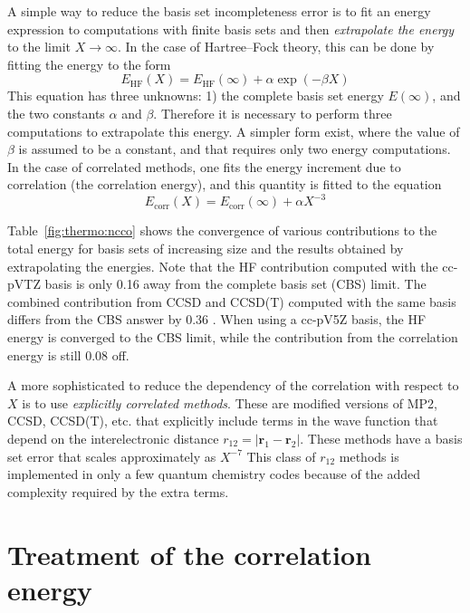 \documentclass[../Main/notes.tex]{subfiles}
\begin{document}
A simple way to reduce the basis set incompleteness error is to fit an energy expression to computations with finite basis sets and then \emph{extrapolate the energy} to the limit $X \rightarrow \infty$.
In the case of Hartree--Fock theory, this can be done by fitting the energy to the form
\begin{equation}
E_\mathrm{HF}(X) = E_\mathrm{HF}(\infty) + \alpha \exp(-\beta X)
\end{equation}
This equation has three unknowns: 1) the complete basis set energy $E(\infty)$, and the two constants $\alpha$ and $\beta$.
Therefore it is necessary to perform three computations to extrapolate this energy.
A simpler form exist, where the value of $\beta$ is assumed to be a constant, and that requires only two energy computations.
In the case of correlated methods, one fits the energy increment due to correlation (the correlation energy), and this quantity is fitted to the equation
\begin{equation}
E_\mathrm{corr}(X) = E_\mathrm{corr}(\infty) + \alpha X^{-3}
\end{equation}


Table~\ref{fig:thermo:ncco} shows the convergence of various contributions to the total energy for basis sets of increasing size and the results obtained by extrapolating the energies.
Note that the HF contribution computed with the cc-pVTZ basis is only 0.16 \kcal away from the complete basis set (CBS) limit.
The combined contribution from CCSD and CCSD(T) computed with the same basis differs from the CBS answer by 0.36 \kcal.
When using a cc-pV5Z basis, the HF energy is converged to the CBS limit, while the contribution from the correlation energy is still 0.08 \kcal off.


A more sophisticated to reduce the dependency of the correlation with respect to $X$ is to use \emph{explicitly correlated methods}. These are modified versions of MP2, CCSD, CCSD(T), etc. that explicitly include terms in the wave function that depend on the interelectronic distance $r_{12} = | \mathbf{r}_1 - \mathbf{r}_2|$. These methods have a basis set error that scales approximately as $X^{-7}$
This class of $r_{12}$ methods is implemented in only a few quantum chemistry codes because of the added complexity required by the extra terms.

\section{Treatment of the correlation energy}
\end{document}
